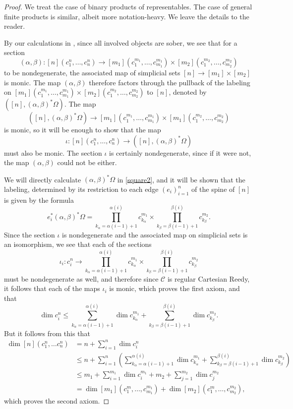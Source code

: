 \documentclass[a4paper]{article}
\numberwithin{equation}{subsection}
\theoremstyle{plain}   %
\theoremstyle{definition}
\theoremstyle{remark}
\theoremstyle{plain}
\providecommand{\C}{}
\renewcommand{\C}{\ensuremath{\mathcal{C}}}
\begin{document}
\begin{proof}
	We treat the case of binary products of representables.  The case of general finite products is similar, albeit more notation-heavy. We leave the details to the reader.

	By our calculations in , since all involved objects are sober, we see that for a section 
	\[
		(\alpha,\beta):[n](c^n_1,\dots,c^n_n) \to [m_1](c^{m_1}_1,\dots,c^{m_1}_{m_1})\times [m_2](c^{m_2}_1,\dots,c^{m_2}_{m_2})
	\]
	to be nondegenerate, the associated map of simplicial sets \([n]\to [m_1]\times [m_2]\) is monic. The map \((\alpha,\beta)\) therefore factors through the pullback of the labeling on \([m_1](c^{m_1}_1,\dots,c^{m_1}_{m_1})\times [m_2](c^{m_2}_1,\dots,c^{m_2}_{m_2})\) to \([n]\), denoted by \(([n],(\alpha,\beta)^\ast \Omega)\).  The map  
	\[
		([n],(\alpha,\beta)^\ast \Omega) \to [m_1](c^{m_1}_1,\dots,c^{m_1}_{m_1})\times [m_1](c^{m_2}_1,\dots,c^{m_2}_{m_2})
	\]
	is monic, so it will be enough to show that the map
	\[
		\iota:[n](c^n_1,\dots,c^n_n)\to ([n],(\alpha,\beta)^\ast \Omega)
	\]
	must also be monic.  The section \(\iota\) is certainly nondegenerate, since if it were not, the map \((\alpha,\beta)\) could not be either.
	
	We will directly calculate \((\alpha,\beta)^\ast \Omega\) in \ref{square2}, and it will be shown that the labeling, determined by its restriction to each edge \((e_i)_{i=1}^n\) of the spine of \([n]\) is given by the formula
	\[
		e_i^\ast (\alpha,\beta)^\ast \Omega = \prod_{k_\alpha=\alpha(i-1)+1}^{\alpha(i)} c^{m_1}_{k_\alpha} \times \prod_{k_\beta=\beta(i-1)+1}^{\beta(i)} c^{m_2}_{k_\beta}.
	\] 
	Since the section \(\iota\) is nondegenerate and the associated map on simplicial sets is an isomorphism,  we see that each of the sections 
	\[
		\iota_i:c^n_i \to \prod_{k_\alpha=\alpha(i-1)+1}^{\alpha(i)} c^{m_1}_{k_\alpha} \times \prod_{k_\beta=\beta(i-1)+1}^{\beta(i)} c^{m_2}_{k_\beta}
	\] 
	must be nondegenerate as well, and therefore since \(\C\) is regular Cartesian Reedy, it follows that each of the maps \(\iota_i\) is monic, which proves the first axiom, and that 
	\[
		\dim c^n_i \leq \sum_{k_\alpha=\alpha(i-1)+1}^{\alpha(i)} \dim c^{m_1}_{k_\alpha} + \sum_{k_\beta=\beta(i-1)+1}^{\beta(i)} \dim c^{m_2}_{k_\beta}.
	\]
	But it follows from this that 
	\begin{align*}
		\dim [n](c^n_1, \dots c^n_n) &= n + \sum_{i=1}^n \dim c^n_i\\
		&\leq n+ \sum_{i=1}^n \left(\sum_{k_\alpha=\alpha(i-1)+1}^{\alpha(i)} \dim c^{m_1}_{k_\alpha} + \sum_{k_\beta=\beta(i-1)+1}^{\beta(i)} \dim c^{m_2}_{k_\beta}\right)\\
		&\leq m_1 + \sum_{i=1}^{m_1} \dim c^{m_1}_i + m_2 + \sum_{j=1}^{m_2} \dim c^{m_2}_j\\
		&=\dim [m_1](c^m_1,\dots,c^{m_1}_{m_1}) + \dim [m_2](c^m_1,\dots,c^{m_2}_{m_2}),
	\end{align*}
	which proves the second axiom.
\end{proof}
\end{document}
